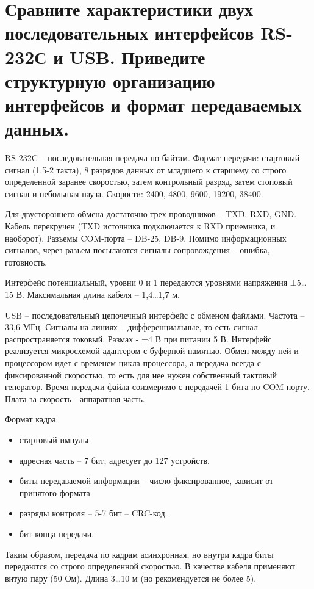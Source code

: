 \documentclass[unicode, 12pt, a4paper, oneside]{article}
\begin{document}
\section{Сравните характеристики двух последовательных интерфейсов RS-232С и USB. Приведите  структурную организацию интерфейсов и формат передаваемых данных.}

RS-232C – последовательная передача по байтам. Формат передачи: стартовый сигнал (1,5-2 такта), 8 разрядов данных от младшего к старшему со строго определенной заранее скоростью, затем контрольный разряд, затем стоповый сигнал и небольшая пауза. Скорости: 2400, 4800, 9600, 19200, 38400.

Для двустороннего обмена достаточно трех проводников – TXD, RXD, GND. Кабель перекручен (TXD источника подключается к RXD приемника, и наоборот). Разъемы COM-порта – DB-25, DB-9. Помимо информационных сигналов, через разъем посылаются сигналы сопровождения – ошибка, готовность.

Интерфейс потенциальный, уровни 0 и 1 передаются уровнями напряжения ±5…15 В. Максимальная длина кабеля – 1,4…1,7 м.

USB – последовательный цепочечный интерфейс с обменом файлами. Частота – 33,6 МГц. Сигналы на линиях – дифференциальные, то есть сигнал распространяется токовый. Размах - ±4 В при питании 5 В. Интерфейс реализуется микросхемой-адаптером с буферной памятью. Обмен между ней и процессором идет с временем цикла процессора, а передача всегда с фиксированной скоростью, то есть для нее нужен собственный тактовый генератор. Время передачи файла соизмеримо с передачей 1 бита по COM-порту. Плата за  скорость - аппаратная часть.

Формат кадра:
\begin{itemize}
\item стартовый импульс
\item адресная часть – 7 бит, адресует до 127 устройств.
\item биты передаваемой информации – число фиксированное, зависит от принятого формата
\item разряды контроля – 5-7 бит – CRC-код.
\item бит конца передачи.
\end{itemize}

Таким образом, передача по кадрам асинхронная, но внутри кадра биты передаются со строго определенной скоростью. В качестве кабеля применяют витую пару (50 Ом). Длина 3…10 м (но рекомендуется не более 5).

\end{document}
